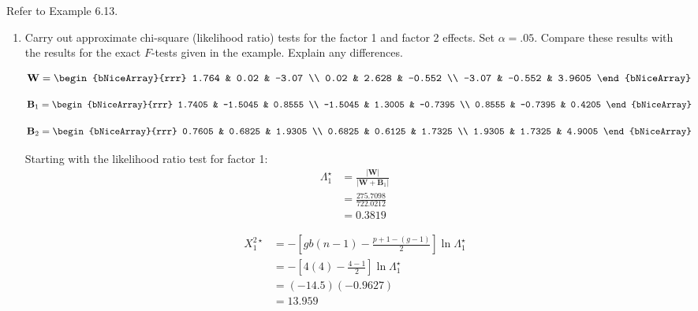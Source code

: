 Refer to Example 6.13.
\begin{enumerate}[label= (\alph*)]
    \item Carry out approximate chi-square (likelihood ratio) tests for the factor 1 and factor 2
    effects. Set $\alpha = .05$. Compare these results with the results for the exact $F$-tests given
    in the example. Explain any differences.

    \begin{align*}
        \textbf{W}
        & =
        \begin{bNiceArray}{rrr}
             1.764 &  0.02  & -3.07 \\
             0.02  &  2.628 & -0.552 \\
            -3.07  & -0.552 & 3.9605
        \end{bNiceArray}
    \end{align*}

    \begin{align*}
        \textbf{B}_{1}
        & =
        \begin{bNiceArray}{rrr}
             1.7405 & -1.5045 &  0.8555 \\
            -1.5045 &  1.3005 & -0.7395 \\ 
             0.8555 & -0.7395 &  0.4205
        \end{bNiceArray}
    \end{align*}

    \begin{align*}
        \textbf{B}_{2}
        & =
        \begin{bNiceArray}{rrr}
            0.7605 & 0.6825 & 1.9305 \\
            0.6825 & 0.6125 & 1.7325 \\
            1.9305 & 1.7325 & 4.9005
        \end{bNiceArray}
    \end{align*}

    Starting with the likelihood ratio test for factor 1:
    \begin{align*}
        \Lambda_{1}^{\star}
        & =
        \frac{|\textbf{W}|}{|\textbf{W} + \textbf{B}_{1}|}
        \\
        & =
        \frac{275.7098}{722.0212}
        \\
        & =
        0.3819
    \end{align*}

    \begin{align*}
        X_{1}^{2 \star}
        & =
        -\left[ gb(n-1) - \frac{p+1-(g-1)}{2} \right] \ln \Lambda_{1}^{\star}
        \\
        & =
        -\left[ 4(4) - \frac{4-1}{2} \right] \ln \Lambda_{1}^{\star}
        \\
        & =
        (-14.5)(-0.9627)
        \\
        & =
        13.959
    \end{align*}


\end{enumerate}
